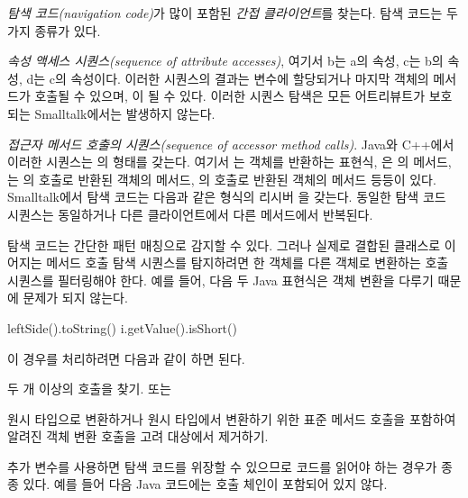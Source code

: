 \documentclass[a4paper,10pt,twoside]{book}
\begin{document}
\emph{탐색 코드(navigation code)}가 많이 포함된 \emph{간접 클라이언트}를 찾는다. 탐색 코드는 두 가지 종류가 있다.

\begin{bulletlist}
\item \emph{속성 액세스 시퀀스(sequence of attribute accesses)}, \eg {} 여기서 b는 a의 속성, c는 b의 속성, d는 c의 속성이다. 이러한 시퀀스의 결과는 변수에 할당되거나 마지막 객체의 메서드가 호출될 수 있으며, \eg {}이 될 수 있다. 이러한 시퀀스 탐색은 모든 어트리뷰트가 보호되는 Smalltalk에서는 발생하지 않는다. 

\item \emph{접근자 메서드 호출의 시퀀스(sequence of accessor method calls)}. Java와 C++에서 이러한 시퀀스는 의 형태를 갖는다. 여기서 는 객체를 반환하는 표현식, 은 의 메서드, 는 의 호출로 반환된 객체의 메서드, 의 호출로 반환된 객체의 메서드 등등이 있다. Smalltalk에서 탐색 코드는 다음과 같은 형식의 리시버 을 갖는다. 동일한 탐색 코드 시퀀스는 동일하거나 다른 클라이언트에서 다른 메서드에서 반복된다.
\end{bulletlist}

탐색 코드는 간단한 패턴 매칭으로 감지할 수 있다. 그러나 실제로 결합된 클래스로 이어지는 메서드 호출 탐색 시퀀스를 탐지하려면 한 객체를 다른 객체로 변환하는 호출 시퀀스를 필터링해야 한다. 예를 들어, 다음 두 Java 표현식은 객체 변환을 다루기 때문에 문제가 되지 않는다.

\begin{code}
leftSide().toString()
i.getValue().isShort()
\end{code}

이 경우를 처리하려면 다음과 같이 하면 된다.

\begin{bulletlist}
\item 두 개 이상의 호출을 찾기. 또는 

\item 원시 타입으로 변환하거나 원시 타입에서 변환하기 위한 표준 메서드 호출을 포함하여 알려진 객체 변환 호출을 고려 대상에서 제거하기.
\end{bulletlist}

추가 변수를 사용하면 탐색 코드를 위장할 수 있으므로 코드를 읽어야 하는 경우가 종종 있다. 예를 들어 다음 Java 코드에는 호출 체인이 포함되어 있지 않다.

\begin{code}
Token token;
token = parseTree.token();
if (token.identifier() != null) {
	...
\end{code}
\end{document}

